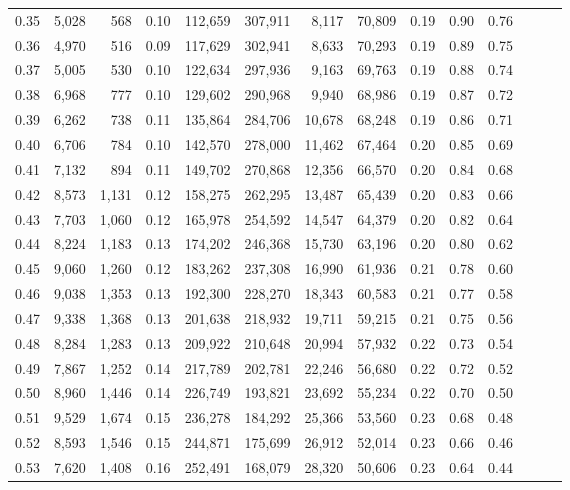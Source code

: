 \begin{tabular}{rrrrrrrrrrrrrr}
0.35 &  5,028 &    568 &  0.10 &  112,659 &  307,911 &   8,117 &  70,809 &  0.19 &  0.90 &      0.76 \\
0.36 &  4,970 &    516 &  0.09 &  117,629 &  302,941 &   8,633 &  70,293 &  0.19 &  0.89 &      0.75 \\
0.37 &  5,005 &    530 &  0.10 &  122,634 &  297,936 &   9,163 &  69,763 &  0.19 &  0.88 &      0.74 \\
0.38 &  6,968 &    777 &  0.10 &  129,602 &  290,968 &   9,940 &  68,986 &  0.19 &  0.87 &      0.72 \\
0.39 &  6,262 &    738 &  0.11 &  135,864 &  284,706 &  10,678 &  68,248 &  0.19 &  0.86 &      0.71 \\
0.40 &  6,706 &    784 &  0.10 &  142,570 &  278,000 &  11,462 &  67,464 &  0.20 &  0.85 &      0.69 \\
0.41 &  7,132 &    894 &  0.11 &  149,702 &  270,868 &  12,356 &  66,570 &  0.20 &  0.84 &      0.68 \\
0.42 &  8,573 &  1,131 &  0.12 &  158,275 &  262,295 &  13,487 &  65,439 &  0.20 &  0.83 &      0.66 \\
0.43 &  7,703 &  1,060 &  0.12 &  165,978 &  254,592 &  14,547 &  64,379 &  0.20 &  0.82 &      0.64 \\
0.44 &  8,224 &  1,183 &  0.13 &  174,202 &  246,368 &  15,730 &  63,196 &  0.20 &  0.80 &      0.62 \\
0.45 &  9,060 &  1,260 &  0.12 &  183,262 &  237,308 &  16,990 &  61,936 &  0.21 &  0.78 &      0.60 \\
0.46 &  9,038 &  1,353 &  0.13 &  192,300 &  228,270 &  18,343 &  60,583 &  0.21 &  0.77 &      0.58 \\
0.47 &  9,338 &  1,368 &  0.13 &  201,638 &  218,932 &  19,711 &  59,215 &  0.21 &  0.75 &      0.56 \\
0.48 &  8,284 &  1,283 &  0.13 &  209,922 &  210,648 &  20,994 &  57,932 &  0.22 &  0.73 &      0.54 \\
0.49 &  7,867 &  1,252 &  0.14 &  217,789 &  202,781 &  22,246 &  56,680 &  0.22 &  0.72 &      0.52 \\
0.50 &  8,960 &  1,446 &  0.14 &  226,749 &  193,821 &  23,692 &  55,234 &  0.22 &  0.70 &      0.50 \\
0.51 &  9,529 &  1,674 &  0.15 &  236,278 &  184,292 &  25,366 &  53,560 &  0.23 &  0.68 &      0.48 \\
0.52 &  8,593 &  1,546 &  0.15 &  244,871 &  175,699 &  26,912 &  52,014 &  0.23 &  0.66 &      0.46 \\
0.53 &  7,620 &  1,408 &  0.16 &  252,491 &  168,079 &  28,320 &  50,606 &  0.23 &  0.64 &      0.44 \\

\end{tabular}

